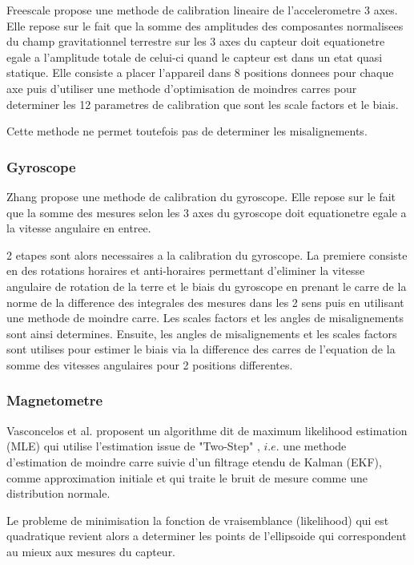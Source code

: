 Freescale propose une methode de calibration lineaire de l'accelerometre 3 axes. Elle repose sur le fait que la somme des amplitudes des composantes normalisees du champ gravitationnel terrestre sur les 3 axes du capteur doit equationetre egale a l'amplitude totale de celui-ci quand le capteur est dans un etat quasi statique. Elle consiste a placer l'appareil dans 8 positions donnees pour chaque axe puis d'utiliser une methode d'optimisation de moindres carres pour determiner les 12 parametres de calibration que sont les scale factors et le biais.

Cette methode ne permet toutefois pas de determiner les misalignements. 

\subsubsection{Gyroscope}

Zhang  propose une methode de calibration du gyroscope\cite{Gyroscope}. Elle repose sur le fait que la somme des mesures selon les 3 axes du gyroscope doit equationetre egale a la vitesse angulaire en entree. 

2 etapes sont alors necessaires a la calibration du gyroscope. La premiere consiste en des rotations horaires et anti-horaires permettant d'eliminer la vitesse angulaire de rotation de la terre et le biais du gyroscope en prenant le carre de la norme de la difference des integrales des mesures dans les 2 sens puis en utilisant une methode de moindre carre. Les scales factors et les angles de misalignements sont ainsi determines. Ensuite, les angles de misalignements et les scales factors sont utilises pour estimer le biais via la difference des carres de l'equation de la somme des vitesses angulaires pour 2 positions differentes.

\subsubsection{Magnetometre}

	Vasconcelos et al. \cite{MLE} proposent un algorithme dit de maximum likelihood estimation (MLE) qui utilise l'estimation issue de "Two-Step" \cite{Two-Step}, $i. e.$ une methode d'estimation de moindre carre suivie d'un filtrage etendu de Kalman (EKF), comme approximation initiale et qui traite le bruit de mesure comme une distribution normale.

	Le probleme de minimisation  la fonction  de vraisemblance (likelihood) qui est quadratique revient alors a determiner les points de l'ellipsoide  qui correspondent au mieux aux mesures du capteur.

